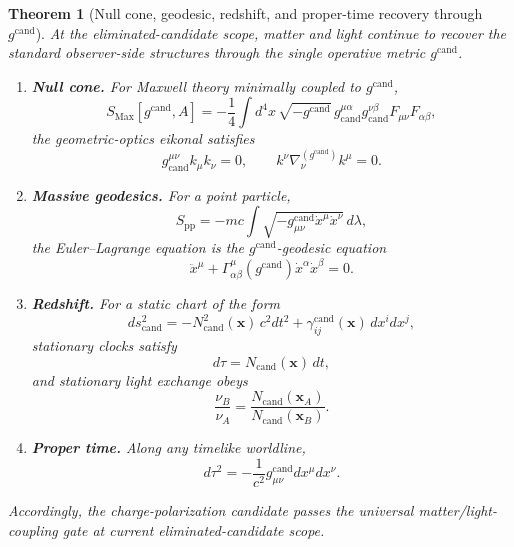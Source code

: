 \documentclass[11pt]{article}
\newcommand{\CandidateMetric}{g^{\mathrm{cand}}}
\newcommand{\Ncand}{N_{\mathrm{cand}}}
\newcommand{\Gcand}{\gamma^{\mathrm{cand}}}
\newtheorem{theorem}{Theorem}
\begin{document}
\begin{theorem}[Null cone, geodesic, redshift, and proper-time recovery through \(\CandidateMetric\)]
\label{thm:phaseE}
At the eliminated-candidate scope, matter and light continue to recover the standard observer-side structures through the single operative metric \(\CandidateMetric\).
\begin{enumerate}
    \item \textbf{Null cone.} For Maxwell theory minimally coupled to \(\CandidateMetric\),
    \begin{equation}
    S_{\mathrm{Max}}[\CandidateMetric,A]
    =
    -\frac14
    \int d^4x\,\sqrt{-\CandidateMetric}\,
    g_{\mathrm{cand}}^{\mu\alpha}g_{\mathrm{cand}}^{\nu\beta}
    F_{\mu\nu}F_{\alpha\beta},
    \label{eq:maxwell}
    \end{equation}
    the geometric-optics eikonal satisfies
    \begin{equation}
    g_{\mathrm{cand}}^{\mu\nu}k_\mu k_\nu=0,
    \qquad
    k^\nu\nabla^{(\CandidateMetric)}_\nu k^\mu=0.
    \label{eq:nullcone}
    \end{equation}
    \item \textbf{Massive geodesics.} For a point particle,
    \begin{equation}
    S_{\mathrm{pp}}
    =
    -mc
    \int
    \sqrt{-\CandidateMetric_{\mu\nu}\dot x^\mu\dot x^\nu}\,d\lambda,
    \label{eq:pp}
    \end{equation}
    the Euler--Lagrange equation is the \(\CandidateMetric\)-geodesic equation
    \begin{equation}
    \ddot x^\mu+\Gamma^\mu_{\alpha\beta}(\CandidateMetric)\dot x^\alpha\dot x^\beta=0.
    \label{eq:geodesic}
    \end{equation}
    \item \textbf{Redshift.} For a static chart of the form
    \begin{equation}
    ds_{\mathrm{cand}}^2
    =
    -\Ncand^2(\mathbf{x})\,c^2dt^2
    +\Gcand_{ij}(\mathbf{x})\,dx^i dx^j,
    \label{eq:staticcand}
    \end{equation}
    stationary clocks satisfy
    \begin{equation}
    d\tau=\Ncand(\mathbf{x})\,dt,
    \label{eq:clock}
    \end{equation}
    and stationary light exchange obeys
    \begin{equation}
    \frac{\nu_B}{\nu_A}
    =
    \frac{\Ncand(\mathbf{x}_A)}{\Ncand(\mathbf{x}_B)}.
    \label{eq:redshift}
    \end{equation}
    \item \textbf{Proper time.} Along any timelike worldline,
    \begin{equation}
    d\tau^2
    =
    -\frac{1}{c^2}
    \CandidateMetric_{\mu\nu}dx^\mu dx^\nu.
    \label{eq:propertime}
    \end{equation}
\end{enumerate}
Accordingly, the charge-polarization candidate passes the universal matter/light-coupling gate at current eliminated-candidate scope.
\end{theorem}
\end{document}
